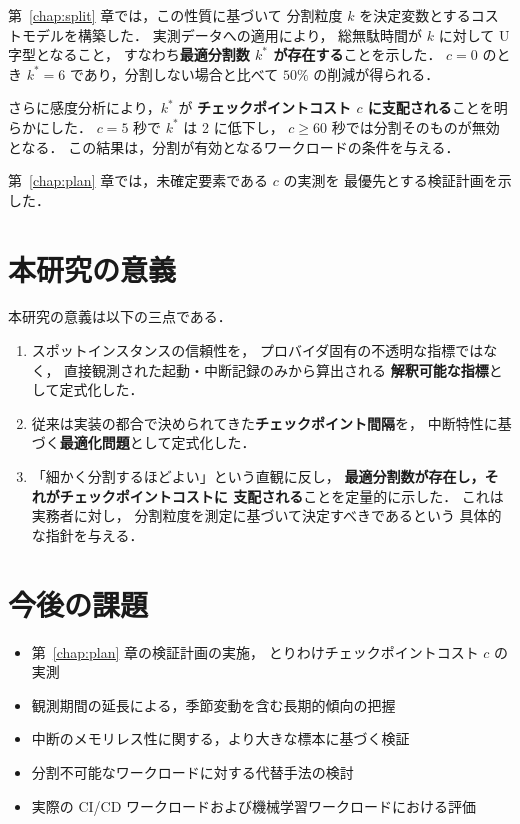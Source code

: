 \documentclass[11pt,a4paper]{ltjsreport}
\begin{document}
第~\ref{chap:split} 章では，この性質に基づいて
分割粒度 $k$ を決定変数とするコストモデルを構築した．
実測データへの適用により，
総無駄時間が $k$ に対して U 字型となること，
すなわち\textbf{最適分割数 $k^{*}$ が存在する}ことを示した．
$c = 0$ のとき $k^{*} = 6$ であり，分割しない場合と比べて
$50\%$ の削減が得られる．

さらに感度分析により，$k^{*}$ が
\textbf{チェックポイントコスト $c$ に支配される}ことを明らかにした．
$c = 5$ 秒で $k^{*}$ は 2 に低下し，
$c \geq 60$ 秒では分割そのものが無効となる．
この結果は，分割が有効となるワークロードの条件を与える．

第~\ref{chap:plan} 章では，未確定要素である $c$ の実測を
最優先とする検証計画を示した．

\section{本研究の意義}

本研究の意義は以下の三点である．

\begin{enumerate}
  \item スポットインスタンスの信頼性を，
        プロバイダ固有の不透明な指標ではなく，
        直接観測された起動・中断記録のみから算出される
        \textbf{解釈可能な指標}として定式化した．
  \item 従来は実装の都合で決められてきた\textbf{チェックポイント間隔}を，
        中断特性に基づく\textbf{最適化問題}として定式化した．
  \item 「細かく分割するほどよい」という直観に反し，
        \textbf{最適分割数が存在し，それがチェックポイントコストに
        支配される}ことを定量的に示した．
        これは実務者に対し，
        分割粒度を測定に基づいて決定すべきであるという
        具体的な指針を与える．
\end{enumerate}

\section{今後の課題}

\begin{itemize}
  \item 第~\ref{chap:plan} 章の検証計画の実施，
        とりわけチェックポイントコスト $c$ の実測
  \item 観測期間の延長による，季節変動を含む長期的傾向の把握
  \item 中断のメモリレス性に関する，より大きな標本に基づく検証
  \item 分割不可能なワークロードに対する代替手法の検討
  \item 実際の CI/CD ワークロードおよび機械学習ワークロードにおける評価
\end{itemize}
\end{document}
